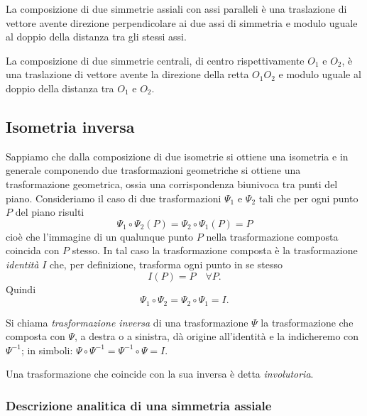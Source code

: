 \begin{proposizione}
La composizione di due simmetrie assiali con assi paralleli è una 
traslazione di vettore avente direzione perpendicolare ai due assi di 
simmetria e modulo uguale al doppio della distanza tra gli stessi 
assi.
\end{proposizione}
			
\begin{proposizione}
La composizione di due simmetrie centrali, di centro rispettivamente 
\(O_1\) e \(O_2\), è una traslazione di vettore avente la direzione della 
retta \(O_1O_2\) e modulo uguale al doppio della distanza tra \(O_1\) e 
\(O_2\).
\end{proposizione}
			
			
\subsection{Isometria inversa}
			
Sappiamo che dalla composizione di due isometrie si ottiene una 
isometria e in generale componendo due trasformazioni geometriche si 
ottiene una trasformazione geometrica, ossia una corrispondenza 
biunivoca tra punti del piano.
Consideriamo il caso di due trasformazioni \(\Psi_1\) e \(\Psi_2\) tali 
che per ogni punto \(P\) del piano risulti
\[\Psi_1 \circ \Psi_2 (P) = \Psi_2 \circ \Psi_1 (P) = P\]
cioè che l'immagine di un qualunque punto \(P\) nella trasformazione 
composta coincida con \(P\) stesso. In tal caso la trasformazione 
composta è la trasformazione \emph{identità} \(I\) che, per 
definizione, trasforma ogni punto in se stesso
\[I(P) = P\quad \forall P.\]
Quindi
\[\Psi_1 \circ \Psi_2 = \Psi_2 \circ \Psi_1 = I.\]

\begin{definizione}
Si chiama \emph{trasformazione inversa} di una trasformazione \(\Psi\) 
la trasformazione che composta con \(\Psi\), a destra o a sinistra, dà 
origine all'identità e la indicheremo con \(\Psi^{-1}\); in simboli: 
\(\Psi \circ \Psi^{-1} = \Psi^{-1} \circ \Psi = I\).
\end{definizione}
			
\begin{definizione}
Una trasformazione che coincide con la sua inversa è detta 
\emph{involutoria}.
\end{definizione}

\subsubsection{Descrizione analitica di una simmetria assiale}

